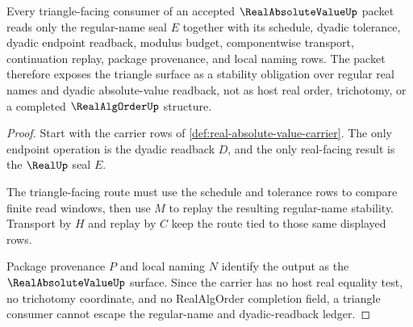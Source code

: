 \begin{theorem}
\label{thm:real-absolute-value-triangle-nonescape}
Every triangle-facing consumer of an accepted $\RealAbsoluteValueUp$ packet reads only the regular-name seal $E$ together with its schedule, dyadic tolerance, dyadic endpoint readback, modulus budget, componentwise transport, continuation replay, package provenance, and local naming rows. The packet therefore exposes the triangle surface as a stability obligation over regular real names and dyadic absolute-value readback, not as host real order, trichotomy, or a completed $\RealAlgOrderUp$ structure.
\end{theorem}
\begin{proof}
Start with the carrier rows of \autoref{def:real-absolute-value-carrier}. The only endpoint operation is the dyadic readback $D$, and the only real-facing result is the $\RealUp$ seal $E$.

The triangle-facing route must use the schedule and tolerance rows to compare finite read windows, then use $M$ to replay the resulting regular-name stability. Transport by $H$ and replay by $C$ keep the route tied to those same displayed rows.

Package provenance $P$ and local naming $N$ identify the output as the $\RealAbsoluteValueUp$ surface. Since the carrier has no host real equality test, no trichotomy coordinate, and no RealAlgOrder completion field, a triangle consumer cannot escape the regular-name and dyadic-readback ledger.
\end{proof}


\begin{closurestatus}{\RealAbsoluteValueUp}
  \theoryclosure{\seedClosure}
  \formalstatus{\theoremCheckedV}
\end{closurestatus}
